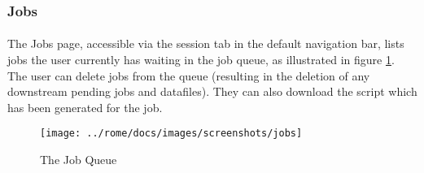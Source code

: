 \subsubsection{Jobs}
\label{view_jobs}

\paragraph{}
The Jobs page, accessible via the session tab in the default navigation bar, lists jobs the user currently has waiting in the job queue, as illustrated in figure \ref{fig:view_jobs}. The user can delete jobs from the queue (resulting in the deletion of any downstream pending jobs and datafiles). They can also download the script which has been generated for the job.

\begin{figure}[h]
\centering
\texttt{[image: ../rome/docs/images/screenshots/jobs]}
\caption{The Job Queue}\label{fig:view_jobs}
\end{figure}

